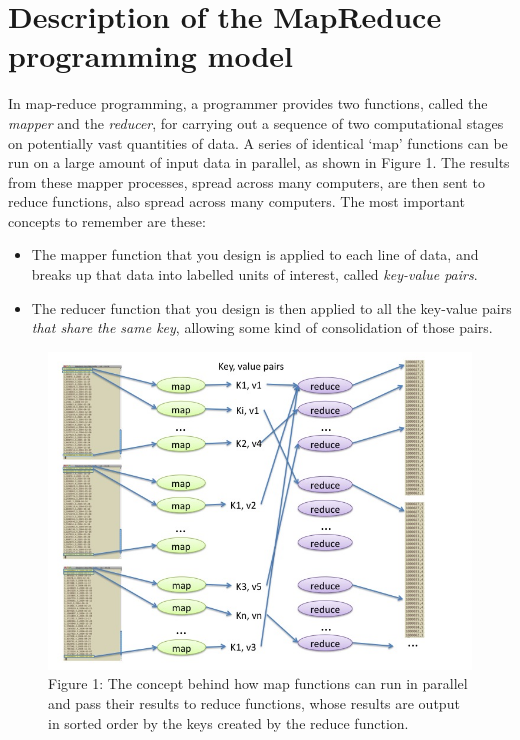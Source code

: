\documentclass[letterpaper,10pt,openany,oneside]{sphinxmanual}
\begin{document}
\section{Description of the MapReduce programming model}
\label{MapReduceIntro/MapReduceIntro:description-of-the-mapreduce-programming-model}
In map-reduce programming, a programmer provides two functions,
called the \emph{mapper} and the \emph{reducer}, for carrying out a sequence
of two computational stages on potentially vast quantities of data.
A series of identical `map' functions can be run on a large amount
of input data in parallel, as shown in Figure 1. The
results from these mapper processes, spread across many computers,
are then sent to reduce functions, also spread across many
computers. The most important concepts to remember are these:
\begin{itemize}
\item {} 
The mapper function that you design is applied to each line of
data, and breaks up that data into labelled units of interest,
called \emph{key-value pairs}.

\item {} 
The reducer function that you design is then applied to all the
key-value pairs \emph{that share the same key}, allowing some kind of
consolidation of those pairs.

\end{itemize}
\begin{figure}[htbp]
\centering
\capstart

\includegraphics{Figure1.jpg}
\caption{Figure 1: The concept behind how map functions can run in parallel and
pass their results to reduce functions, whose results are output in
sorted order by the keys created by the reduce function.}\end{figure}
\end{document}
